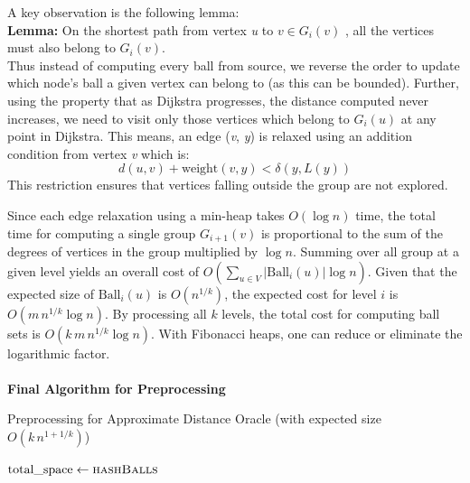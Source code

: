 \documentclass{article}
\begin{document}
A key observation is the following lemma: \\
\textbf{Lemma: } On the shortest path from vertex \textit{u} to \(v \in G_i(v)\)  , all the vertices must also belong to \(G_i(v)\). \\

Thus instead of computing every ball from source, we reverse the order to update which node's ball a given vertex can belong to (as this can be bounded). Further, using the property that as Dijkstra progresses, the distance computed never increases, we need to visit only those vertices which belong to \(G_i(u)\) at any point in Dijkstra. This means, an edge (\textit{v}, \textit{y}) is relaxed using an addition condition from vertex \textit{v} which is:
\[
d(u, v) + \text{weight}(v, y) < \delta(y, L(y))
\]
This restriction ensures that vertices falling outside the group are not explored.

Since each edge relaxation using a min-heap takes \(O(\log n)\) time, the total time for computing a single group \(G_{i+1}(v)\) is proportional to the sum of the degrees of vertices in the group multiplied by \(\log n\). Summing over all group at a given level yields an overall cost of
\(
O\left(\sum_{u \in V} |\text{Ball}_i(u)| \log n\right).
\)
Given that the expected size of \(\text{Ball}_i(u)\) is \(O(n^{1/k})\), the expected cost for level \(i\) is \(O(m\,n^{1/k}\log n)\). By processing all \(k\) levels, the total cost for computing ball sets is \(O(k\,m\,n^{1/k}\log n)\). With Fibonacci heaps, one can reduce or eliminate the logarithmic factor.
\\\\
\textbf{Final Algorithm for Preprocessing}
\begin{algorithm}[H]
    \caption{Preprocessing for Approximate Distance Oracle (with expected size \(O(k\,n^{1+1/k})\))}
    \label{alg:preprocessing}
    \begin{algorithmic}[1]
        \State {}
            \State {}
        \EndFor
                    \State {}
                \EndIf
            \EndFor
        \EndFor

        \medskip

        \medskip
        
        \State \( \text{total\_space} \gets \Call{hashBalls}{} \)
        \State {}
    \EndProcedure
    \end{algorithmic}
    \end{algorithm}
\end{document}
